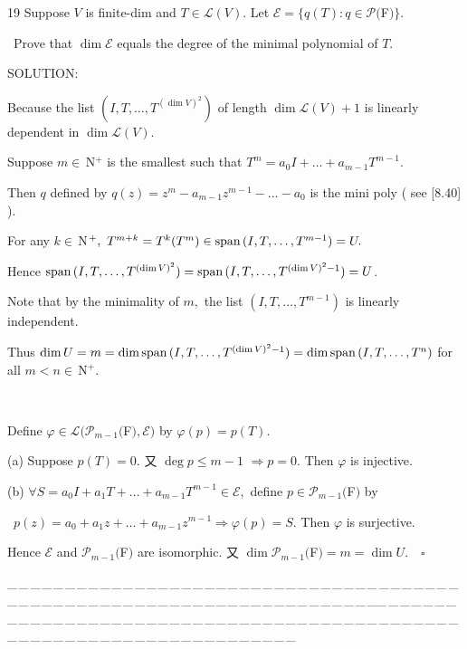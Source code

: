 \documentclass[a4paper, 11pt, UTF8]{article}
\def\Spn{\textup{span}\,}
\def\Lm{\mathcal{L}}
\def\Po{\mathcal{P}}
\def\Nbp{$\,{\timesbf N}$^+}
\begin{document}
\begin{large}
{\timesbf\Large 19} {\timessl\Large Suppose $V$ is finite-dim and $T\in \Lm(V)$. Let $\mathcal{E} = \{q(T): q \in \Po(${\timesbf F}$)\}$.
}\par\quad\,
{\timessl\Large
Prove that $\dim \mathcal{E}$ equals the degree of the minimal polynomial of $T$.
}\par
{\timesbf S\footnotesize{OLUTION:}}\par\quad
Because the list $(I,T,\dots,T^{(\dim V)^2})$ of length $\dim\Lm(V)+1$ is linearly dependent in $\dim\Lm(V).$\par\quad
Suppose $m\in\Nbp$ is the smallest such that $T^m=a_0 I+\dots+a_{m-1}T^{m-1}.$\par\quad
Then $q$ defined by $q(z)=z^m-a_{m-1}z^{m-1}-\dots-a_0$ is the mini poly ( see [8.40] ).\par\quad
For any $k\in\Nbp,\,\,T^{m+k}=T^k(T^m)\in\Spn(I,T,\dots,T^{m-1})=U.$\par\quad
Hence $\Spn(I,T,\dots,T^{(\dim V)^2})=\Spn(I,T,\dots,T^{(\dim V)^2-1})=U$.\par\quad
Note that by the minimality of $m,$ the list $(I,T,\dots,T^{m-1})$ is linearly independent.\par\quad
Thus $\dim U=m=\dim\Spn(I,T,\dots,T^{(\dim V)^2-1})=\dim\Spn(I,T,\dots,T^n)$ for all $m<n\in\Nbp.$\par{\tiny\,\par}\quad
Define $\varphi\in\Lm(\Po_{m-1}(${\timesbf F}$),\mathcal{E})$ by $\varphi(p)=p(T).$\par\quad
(a) Suppose $p(T)=0.$ 又 $\deg p\leq m-1$ $\Rightarrow p=0.$ Then $\varphi$ is injective.\par\quad
(b) $\forall S=a_0 I+a_1 T+\dots+a_{m-1}T^{m-1}\in\mathcal{E},$ define $p\in\Po_{m-1}(${\timesbf F}$)$ by\par\qquad\,
$p(z)=a_0+a_1 z+\dots+a_{m-1}z^{m-1}\Rightarrow\varphi(p)=S.$ Then $\varphi$ is surjective.\par\quad
Hence $\mathcal{E}$ and $\Po_{m-1}(${\timesbf F}$)$ are isomorphic. 又 $\dim\Po_{m-1}(${\timesbf F}$)=m=\dim U.
\quad\square$\par
{\tiny \_\,\_\,\_\,\_\,\_\,\_\,\_\,\_\,\_\,\_\,\_\,\_\,\_\,\_\,\_\,\_\,\_\,\_\,\_\,\_\,\_\,\_\,\_\,\_\,\_\,\_\,\_\,\_\,\_\,\_\,\_\,\_\,\_\,\_\,\_\,\_\,\_\,\_\,\_\,\_\,\_\,\_\,\_\,\_\,\_\,\_\,\_\,\_\,\_\,\_\,\_\,\_\,\_\,\_\,\_\,\_\,\_\,\_\,\_\,\_\,\_\,\_\,\_\,\_\,\_\,\_\,\_\,\_\,\_\,\_\,\_\_\,\_\,\_\,\_\,\_\,\_\,\_\,\_\,\_\,\_\,\_\,\_\,\_\,\_\,\_\,\_\,\_\,\_\,\_\,\_\,\_\,\_\,\_\,\_\,\_\,\_\,\_\,\_\,\_\,\_\,\_\,\_\,\_\,\_\,\_\,\_\,\_\,\_\,\_\,\_\,\_\,\_\,\_\,\_\,\_\,\_\,\_\,\_\,\_\,\_\,\_\,\_\,\_\,\_\,\_\,\_\,\_\,\_\,\_\,\_\,\_\,\_\,\_\,\_\,\_\,\_\,\_\,\_\,\_\,\_\,\_}\par{\tiny\,\par}


\end{large}
\end{document}
